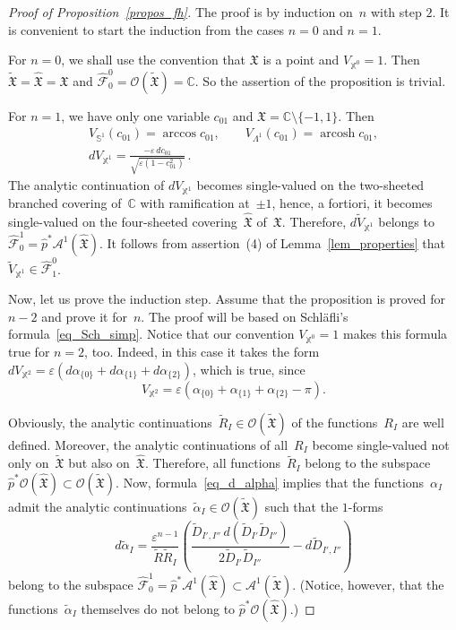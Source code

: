 \documentclass[reqno,tbtags,12pt]{amsart}
\numberwithin{equation}{section}
\newcommand{\C}{\mathbb{C}}
\newcommand{\X}{\mathbb{X}}
\newcommand{\FX}{\mathfrak{X}}
\newcommand{\tFX}{\widetilde{\mathfrak{X}}}
\newcommand{\hFX}{\widehat{\mathfrak{X}}}
\newcommand{\hCF}{\widehat{\mathcal{F}}}
\newcommand{\CO}{\mathcal{O}}
\newcommand{\bS}{\mathbb{S}}
\newcommand{\A}{\mathcal{A}}
\newcommand{\tV}{\widetilde{V}}
\newcommand{\tR}{\widetilde{R}}
\newcommand{\tD}{\widetilde{D}}
\newcommand{\talpha}{\widetilde{\alpha}}
\newcommand{\hp}{\hat{p}}
\newcommand{\arcosh}{\mathop{\mathrm{arcosh}}\nolimits}
\theoremstyle{definition}
\begin{document}
\begin{proof}[Proof of Proposition~\ref{propos_fh}]
The proof is by induction on~$n$ with step $2$. It is convenient to start the induction from the cases $n=0$ and $n=1$.

For $n=0$, we shall use the convention that  $\FX$ is a point and $V_{\X^0}=1$. Then $\tFX=\hFX=\FX$ and $\hCF_0^0=\CO(\tFX)=\C$. So the assertion of the proposition is trivial.

For $n=1$, we have only one variable $c_{01}$ and $\FX=\C\setminus\{-1,1\}$. Then
\begin{gather}\label{eq_n=1}
V_{\bS^1}(c_{01})=\arccos c_{01},\qquad V_{\Lambda^1}(c_{01})=\arcosh c_{01},\\
dV_{\X^1}=\frac{-\varepsilon\,dc_{01}}{\sqrt{\varepsilon(1-c_{01}^2)}}\,.
\end{gather}
The analytic continuation of  $d V_{\X^1}$ becomes single-valued on the two-sheeted branched covering of~$\C$ with ramification at~$\pm 1$, hence, a fortiori,  it becomes  single-valued on the four-sheeted covering~$\hFX$ of~$\FX$. Therefore, $d\tV_{\X^1}$ belongs to  $\hCF^1_0=\hp^*\A^1(\hFX)$. It follows from assertion~(4) of Lemma~\ref{lem_properties} that $\tV_{\X^1}\in\hCF^0_1$.



Now, let us prove the induction step. Assume that the proposition is proved for $n-2$ and prove it for~$n$. The proof will be based on Schl\"afli's formula~\eqref{eq_Sch_simp}. Notice that our convention $V_{\X^0}=1$ makes this formula true for $n=2$, too. Indeed, in this case it takes the form $dV_{\X^2}=\varepsilon(d\alpha_{\{0\}}+d\alpha_{\{1\}}+d\alpha_{\{2\}})$, which is true, since 
\begin{equation}\label{eq_area}									
V_{\X^2}=\varepsilon(\alpha_{\{0\}}+\alpha_{\{1\}}+\alpha_{\{2\}}-\pi).
\end{equation}

Obviously, the analytic continuations~$\widetilde{R}_I\in\CO(\tFX)$ of the functions~$R_I$ are well defined. Moreover, the analytic continuations of all~$R_I$ become single-valued not only on~$\tFX$ but also on~$\hFX$. Therefore, all functions~$\widetilde{R}_I$ belong to the subspace $\hp^*\CO(\hFX)\subset\CO(\tFX)$. Now, formula~\eqref{eq_d_alpha} implies that the functions~$\alpha_I$ admit the analytic continuations~$\talpha_I\in \CO(\tFX)$ such that the $1$-forms  
\begin{equation}\label{eq_d_talpha}
d\talpha_I=\frac{\varepsilon^{n-1}}{\tR\tR_I}\left(
\frac{\tD_{I',I''}\,d(\tD_{I'}\tD_{I''})}{2\tD_{I'}\tD_{I''}}-d\tD_{I',I''}\right)
\end{equation}
belong to the subspace $\hCF^1_0=\hp^*\A^1(\hFX)\subset\A^1(\tFX)$. (Notice, however, that the functions~$\talpha_I$ themselves do not belong to $\hp^*\CO(\hFX)$.)


\end{proof}
\end{document}
